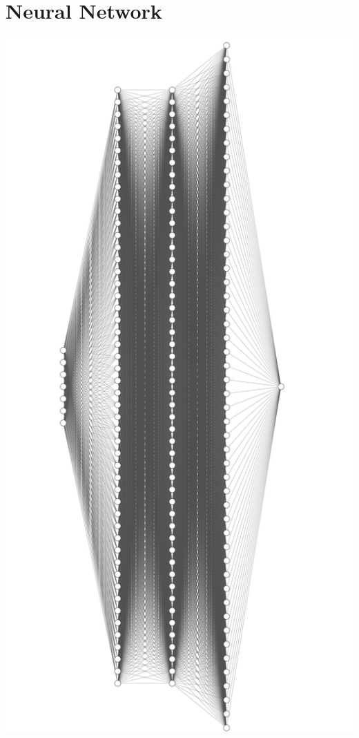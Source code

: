 \documentclass{article}
\begin{document}
\section{Neural Network}
\centering
\includegraphics[scale = 0.15]{NeuralNetwork.jpeg}
\end{document}
